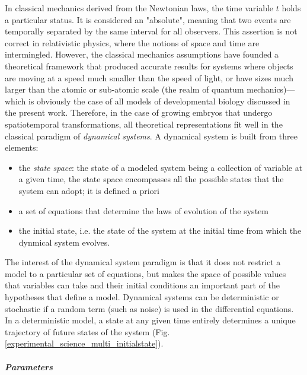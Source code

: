 In classical mechanics derived from the Newtonian laws, the time variable $t$ holds a particular status. It is considered an "absolute", meaning that two events are temporally separated by the same interval for all observers. This assertion is not correct in relativistic physics, where the notions of space and time are intermingled. However, the classical mechanics assumptions have founded a theoretical framework that produced accurate results for systems where objects are moving at a speed much smaller than the speed of light, or have sizes much larger than the atomic or sub-atomic scale (the realm of quantum mechanics)---which is obviously the case of all models of developmental biology discussed in the present work. Therefore, in the case of growing embryos that undergo spatiotemporal transformations, all theoretical representations fit well in the classical paradigm of \textit{dynamical systems}. A dynamical system is built from three elements:
\begin{itemize}
	\item the \textit{state space}: the state of a modeled system being a collection of variable at a given time, the state space encompasses all the possible states that the system can adopt; it is defined a priori
	\item a set of equations that determine the laws of evolution of the system
	\item the initial state, i.e. the state of the system at the initial time from which the dynmical system evolves.
\end{itemize}

The interest of the dynamical system paradigm is that it does not restrict a model to a particular set of equations, but makes the space of possible values that variables can take and their initial conditions an important part of the hypotheses that define a model. Dynamical systems can be deterministic or stochastic if a random term (such as noise) is used in the differential equations. In a deterministic model, a state at any given time entirely determines a unique trajectory of future states of the system (Fig. \ref{experimental_science_multi_initialstate}).

\subparagraph{Parameters}


